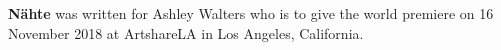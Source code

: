 \textbf{Nähte} was written for Ashley Walters who is to give the world premiere
on 16 November 2018 at ArtshareLA in Los Angeles, California.
